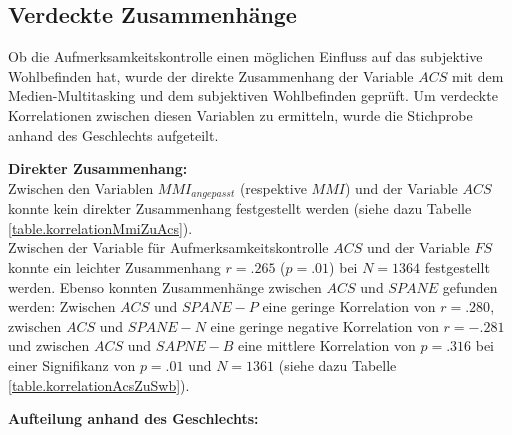 \subsection{Verdeckte Zusammenhänge}
Ob die Aufmerksamkeitskontrolle einen möglichen Einfluss auf das subjektive Wohlbefinden hat, wurde der direkte Zusammenhang der Variable $ACS$ mit dem Medien-Multitasking und dem subjektiven Wohlbefinden geprüft. Um verdeckte Korrelationen zwischen diesen Variablen zu ermitteln, wurde die Stichprobe anhand des Geschlechts aufgeteilt.\par
\textbf{Direkter Zusammenhang:}\\
Zwischen den Variablen $MMI_{angepasst}$ (respektive $MMI$) und der Variable $ACS$ konnte kein direkter Zusammenhang festgestellt werden (siehe dazu Tabelle \ref{table.korrelationMmiZuAcs}).\\
Zwischen der Variable für Aufmerksamkeitskontrolle $ACS$ und der Variable $FS$ konnte ein leichter Zusammenhang $r=.265$ ($p=.01$) bei $N=1364$ festgestellt werden. Ebenso konnten Zusammenhänge zwischen $ACS$ und $SPANE$ gefunden werden: Zwischen $ACS$ und $SPANE-P$ eine geringe Korrelation von $r=.280$, zwischen $ACS$ und $SPANE-N$ eine geringe negative Korrelation von $r=-.281$ und zwischen $ACS$ und $SAPNE-B$ eine mittlere Korrelation von $p=.316$ bei einer Signifikanz von $p=.01$ und $N=1361$ (siehe dazu Tabelle \ref{table.korrelationAcsZuSwb}).
\par
\textbf{Aufteilung anhand des Geschlechts:}\\
\par







